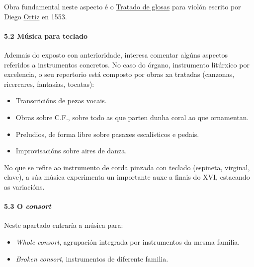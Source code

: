 \documentclass[
]{article}
\begin{document}
Obra fundamental neste aspecto é o
\href{http://es.wikipedia.org/wiki/Tratado_de_glosas}{Tratado de glosas}
para violón escrito por Diego
\href{http://es.wikipedia.org/wiki/Diego_Ortiz}{Ortiz} en 1553.

\hypertarget{52-muxfasica-para-teclado}{%
\paragraph{\texorpdfstring{\textbf{5.2 Música para
teclado}}{5.2 Música para teclado}}\label{52-muxfasica-para-teclado}}

Ademais do exposto con anterioridade, interesa comentar algúns aspectos
referidos a instrumentos concretos. No caso do órgano, instrumento
litúrxico por excelencia, o seu repertorio está composto por obras xa
tratadas (canzonas, ricercares, fantasías, tocatas):

\begin{itemize}
\item
  Transcricións de pezas vocais.
\item
  Obras sobre C.F., sobre todo as que parten dunha coral ao que
  ornamentan.
\item
  Preludios, de forma libre sobre pasaxes escalísticos e pedais.
\item
  Improvisacións sobre aires de danza.
\end{itemize}

No que se refire ao instrumento de corda pinzada con teclado (espineta,
virginal, clave), a súa música experimenta un importante auxe a finais
do XVI, estacando as variacións.

\hypertarget{53-o-consort}{%
\paragraph{\texorpdfstring{\textbf{5.3 O
\emph{consort}}}{5.3 O consort}}\label{53-o-consort}}

Neste apartado entraría a música para:

\begin{itemize}
\item
  \emph{Whole consort}, agrupación integrada por instrumentos da mesma
  familia.
\item
  \emph{Broken consort}, instrumentos de diferente familia.
\end{itemize}
\end{document}
